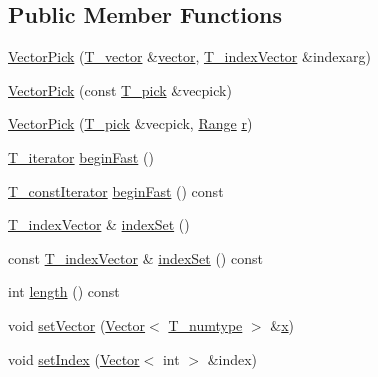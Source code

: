 \subsection*{Public Member Functions}
\begin{DoxyCompactItemize}
\item 
\hyperlink{classVectorPick_ab14d106783a9792094d514ba01882bb1}{Vector\+Pick} (\hyperlink{classVectorPick_ad84fb47502945888eb8854b1460e493b}{T\+\_\+vector} \&\hyperlink{classVectorPick_ada686dd18fcd948bc70673f5aa8e9e14}{vector}, \hyperlink{classVectorPick_aa9b24fd60f963a737fa946622c5e39a2}{T\+\_\+index\+Vector} \&indexarg)
\item 
\hyperlink{classVectorPick_a4a21c5260690030332b01f5ef0b48146}{Vector\+Pick} (const \hyperlink{classVectorPick_ab257fd713ce0f2a81bc79059cec93ac9}{T\+\_\+pick} \&vecpick)
\item 
\hyperlink{classVectorPick_a423da234d663ce887658739472ad71ab}{Vector\+Pick} (\hyperlink{classVectorPick_ab257fd713ce0f2a81bc79059cec93ac9}{T\+\_\+pick} \&vecpick, \hyperlink{classRange}{Range} \hyperlink{indexexpr_8h_ac434fd11cc2493608d8d91424d60c17e}{r})
\item 
\hyperlink{classVectorPick_a8c1792384cedd1074814cc152aea9e72}{T\+\_\+iterator} \hyperlink{classVectorPick_ac838bc112796e55b2fb8d947da294139}{begin\+Fast} ()
\item 
\hyperlink{classVectorPick_a5c6029ef4573adb719b497be94ce2a57}{T\+\_\+const\+Iterator} \hyperlink{classVectorPick_a31b9c882f8cf5cba3d0013dd8ecb7fd6}{begin\+Fast} () const 
\item 
\hyperlink{classVectorPick_aa9b24fd60f963a737fa946622c5e39a2}{T\+\_\+index\+Vector} \& \hyperlink{classVectorPick_aee2f5ca29b2009f4b994c45d844860be}{index\+Set} ()
\item 
const \hyperlink{classVectorPick_aa9b24fd60f963a737fa946622c5e39a2}{T\+\_\+index\+Vector} \& \hyperlink{classVectorPick_a72a2a0e2ffe6006a67f1c200430daeca}{index\+Set} () const 
\item 
int \hyperlink{classVectorPick_af826c2b7b660235b9cb087ecee9ba153}{length} () const 
\item 
void \hyperlink{classVectorPick_a15b7b1ce0c9fd0177183c06a9401eb5e}{set\+Vector} (\hyperlink{classVector}{Vector}$<$ \hyperlink{classVectorPick_a8e830396ccfaea2b85a2a442f45fca35}{T\+\_\+numtype} $>$ \&\hyperlink{vecnorm1_8cc_ac73eed9e41ec09d58f112f06c2d6cb63}{x})
\item 
void \hyperlink{classVectorPick_afef469cd7c207d158a5538478b74aca9}{set\+Index} (\hyperlink{classVector}{Vector}$<$ int $>$ \&index)

\end{DoxyCompactItemize}
